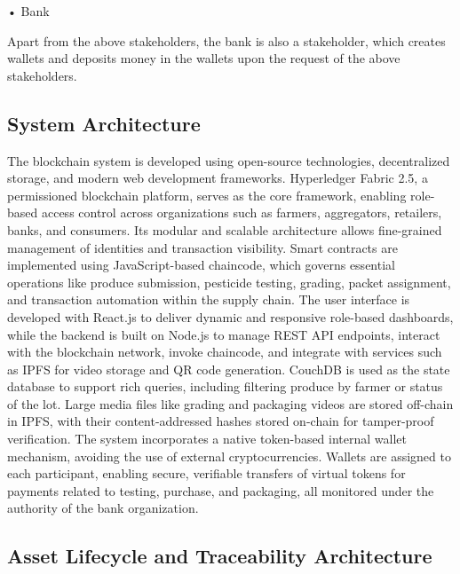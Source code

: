 \documentclass[12pt]{article}
\begin{document}
	• Bank
	
	Apart from the above stakeholders, the bank is also a stakeholder, which creates wallets and deposits money in the wallets upon the request of the above stakeholders.
	
	
	
	
	
	
	
	
	
	
	\subsection{System Architecture}
	
	
	
	The blockchain system is developed using open-source technologies, decentralized storage, and modern web development frameworks. Hyperledger Fabric 2.5, a permissioned blockchain platform, serves as the core framework, enabling role-based access control across organizations such as farmers, aggregators, retailers, banks, and consumers. Its modular and scalable architecture allows fine-grained management of identities and transaction visibility. Smart contracts are implemented using JavaScript-based chaincode, which governs essential operations like produce submission, pesticide testing, grading, packet assignment, and transaction automation within the supply chain. The user interface is developed with React.js to deliver dynamic and responsive role-based dashboards, while the backend is built on Node.js to manage REST API endpoints, interact with the blockchain network, invoke chaincode, and integrate with services such as IPFS for video storage and QR code generation. CouchDB is used as the state database to support rich queries, including filtering produce by farmer or status of the lot. Large media files like grading and packaging videos are stored off-chain in IPFS, with their content-addressed hashes stored on-chain for tamper-proof verification. The system incorporates a native token-based internal wallet mechanism, avoiding the use of external cryptocurrencies. Wallets are assigned to each participant, enabling secure, verifiable transfers of virtual tokens for payments related to testing, purchase, and packaging, all monitored under the authority of the bank organization.
	
	
	\subsection{Asset Lifecycle and Traceability Architecture}
	\label{sec:asset-lifecycle}
	
\end{document}
